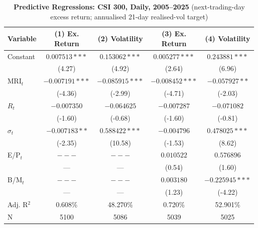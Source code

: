 \begin{table}[htbp]
\centering
\caption{\textbf{Predictive Regressions: CSI 300, Daily, 2005--2025} (next-trading-day excess return; annualised 21-day realised-vol target)}
\label{tab:csi300d}
\begin{tabular}{lcccc}
\toprule
Variable & (1) Ex. Return & (2) Volatility & (3) Ex. Return & (4) Volatility \\
\midrule
Constant & $0.007513***$ & $0.153062***$ & $0.005277***$ & $0.243881***$ \\
 & (4.27) & (4.92) & (2.64) & (6.96) \\
MRI$_t$ & $-0.007191***$ & $-0.085915***$ & $-0.008452***$ & $-0.057927**$ \\
 & (-4.36) & (-2.99) & (-4.71) & (-2.03) \\
$R_t$ & $-0.007350$ & $-0.064625$ & $-0.007287$ & $-0.071082$ \\
 & (-1.60) & (-0.68) & (-1.60) & (-0.81) \\
$\sigma_t$ & $-0.007183**$ & $0.588422***$ & $-0.004796$ & $0.478025***$ \\
 & (-2.35) & (10.58) & (-1.53) & (8.62) \\
E/P$_t$ & $---$ & $---$ & $0.010522$ & $0.576896$ \\
 & --- & --- & (0.54) & (1.60) \\
B/M$_t$ & $---$ & $---$ & $0.003180$ & $-0.225945***$ \\
 & --- & --- & (1.23) & (-4.22) \\
\midrule
Adj. R$^2$ & 0.608\% & 48.270\% & 0.720\% & 52.901\% \\
N & 5100 & 5086 & 5039 & 5025 \\
\bottomrule
\end{tabular}
\end{table}